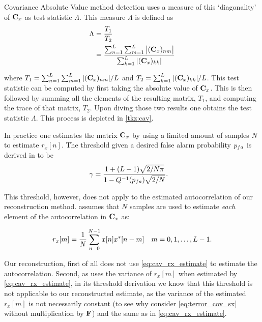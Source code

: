 \documentclass[a4paper, openany, oneside]{memoir}
\begin{document}
Covariance Absolute Value method detection uses a measure of this `diagonality' of $\mat{C}_x$ as test statistic $\Lambda$.
This measure $\Lambda$ is defined as
\begin{align}\label{eq:cav_statistic}
\Lambda &= \frac{T_1}{T_2} \nonumber \\
&=\frac{\sum_{n=1}^{L} \sum_{m=1}^L \left|(\mat{C}_x)_{nm}\right|}{\sum_{k=1}^L |(\mat{C}_x)_{kk}|}
\end{align} 

where $T_1 = \sum_{n=1}^{L} \sum_{m=1}^L |(\mat{C}_x)_{nm}|/L$ and
$T_2 = \sum_{k=1}^L |(\mat{C}_x)_{kk}|/L$.
This test statistic can be computed by first taking the absolute value of $\mat{C}_x$. This is then followed by summing all the elements of the resulting matrix, $T_1$, and computing the trace of that matrix, $T_2$. Upon diving those two results one obtains the test statistic $\Lambda$. This process is depicted in \cref{tkz:cav}.

In practice one estimates the matrix $\mat{C}_x$ by using a limited amount of samples $N$ to estimate $r_x[n]$. The threshold given a desired false alarm probability
$p\ss{fa}$ is derived in \cite{zheng2009spectrum} to be
\begin{align*}
\gamma &= \frac{1+(L-1)\sqrt{2/N\pi}}{1-Q^{-1}(p\ss{fa})\sqrt{2/N}}.
\end{align*} 

This threshold, however, does not apply to the estimated autocorrelation of our reconstruction method.  \cite{zheng2009spectrum} assumes that
$N$ samples are used to estimate \emph{each} element of the autocorrelation in $\mat{C}_x$ as:

\begin{align}\label{eq:cav_rx_estimate}
r_x[m] &= \frac{1}{N}\sum_{n=0}^{N-1}x[n]\conj{x}[n-m] & m=0,1,\ldots, L-1.
\end{align}

Our reconstruction, first of all does not use \cref{eq:cav_rx_estimate} to estimate the autocorrelation. Second, as \cite{zheng2009spectrum} uses
the variance of $r_x[m]$ when estimated by \cref{eq:cav_rx_estimate}, in its threshold derivation we know that this threshold is not applicable
to our reconstructed estimate, as the variance of the estimated $r_x[m]$ is not necessarily constant (to see why consider \cref{eq:terror_cov_sx} without multiplication by $\mat{F}$) and the same as in \cref{eq:cav_rx_estimate}.  
\end{document}
